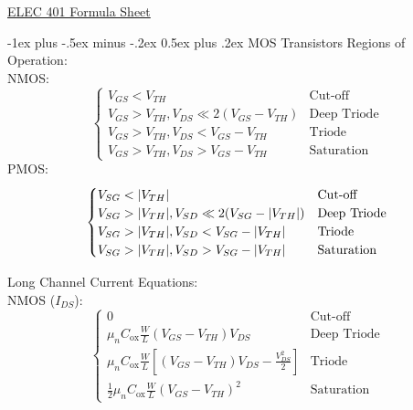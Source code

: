 \documentclass[12pt,landscape]{article}
\makeatletter
\renewcommand{\section}{\@startsection{section}{1}{0mm}%
                                {-1ex plus -.5ex minus -.2ex}%
                                {0.5ex plus .2ex}%
                                {\normalfont\normalsize\bfseries}}
\newcommand{\tab}{\hspace*{1em}}
\newcommand{\ds}{\displaystyle}
\theoremstyle{definition}
\makeatother
\begin{document}
\raggedright
\footnotesize
\begin{multicols}{3}

\raggedcolumns

\setlength{\premulticols}{1pt}
\setlength{\postmulticols}{1pt}
\setlength{\multicolsep}{1pt}
\setlength{\columnsep}{2pt}

\begin{center}
	\Large{\underline{ELEC 401 Formula Sheet}}
\end{center}

\section{MOS Transistors}
Regions of Operation:\\
\tab NMOS:
\begin{equation*}
\begin{cases}
	V_{GS} < V_{TH}& \text{Cut-off}\\
	V_{GS} > V_{TH}, V_{DS} \ll 2(V_{GS} - V_{TH}) & \text{Deep Triode}\\
	V_{GS} > V_{TH}, V_{DS} < V_{GS} - V_{TH} & \text{Triode}\\
	V_{GS} > V_{TH}, V_{DS} > V_{GS} - V_{TH}  & \text{Saturation}
\end{cases}
\end{equation*}
\tab PMOS:
\begin{equation*}
\begin{cases}
V_{SG} < \abs{V_{TH}}& \text{Cut-off}\\
V_{SG} > \abs{V_{TH}}, V_{SD} \ll 2(V_{SG} - \abs{V_{TH}}) & \text{Deep Triode}\\
V_{SG} >\abs{V_{TH}}, V_{SD} < V_{SG} - \abs{V_{TH}} & \text{Triode}\\
V_{SG} > \abs{V_{TH}}, V_{SD} > V_{SG} - \abs{V_{TH}}  & \text{Saturation}
\end{cases}
\end{equation*}

Long Channel Current Equations:\\
\tab NMOS ($I_{DS}$):
\begin{equation*}
\begin{cases}
0 & \text{Cut-off}\\
\ds \mu_n C_\text{ox} \frac{W}{L} (V_{GS} - V_{TH}) V_{DS} & \text{Deep Triode}\\[0.5em]
\ds \mu_n C_\text{ox} \frac{W}{L} \left[(V_{GS} - V_{TH}) V_{DS} - \frac{V_{DS}^2}{2}\right] & \text{Triode}\\[1em]
\ds \frac{1}{2} \mu_n C_\text{ox} \frac{W}{L} (V_{GS} - V_{TH})^2 & \text{Saturation}
\end{cases}
\end{equation*}


\end{multicols}
\end{document}
